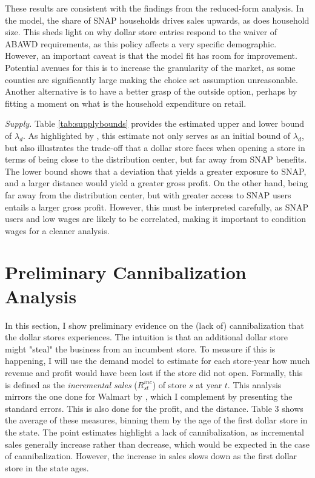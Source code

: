 \documentclass[11.5pt]{article}
\begin{document}
These results are consistent with the findings from the reduced-form analysis. In the model, the share of SNAP households drives sales upwards, as does household size. This sheds light on why dollar store entries respond to the waiver of ABAWD requirements, as this policy affects a very specific demographic. However, an important caveat is that the model fit has room for improvement. Potential avenues for this is to increase the granularity of the market, as some counties are significantly large making the choice set assumption unreasonable. Another alternative is to have a better grasp of the outside option, perhaps by fitting a moment on what is the household expenditure on retail. 






\newpage
\textit{Supply.} Table \ref{tab:supplybounds} provides the estimated upper and lower bound of $\lambda_d$. As highlighted by \citeauthor{houde2023nexus} \citeyear{houde2023nexus}, this estimate not only serves as an initial bound of $\lambda_d$, but also illustrates the trade-off that a dollar store faces when opening a store in terms of being close to the distribution center, but far away from SNAP benefits. The lower bound shows that a deviation that yields a greater exposure to SNAP, and a larger distance would yield a greater gross profit. On the other hand, being far away from the distribution center, but with greater access to SNAP users entails a larger gross profit. However, this must be interpreted carefully, as SNAP users and low wages are likely to be correlated, making it important to condition wages for a cleaner analysis. 





\section{Preliminary Cannibalization Analysis}

In this section, I show preliminary evidence on the (lack of) cannibalization that the dollar stores experiences. The intuition is that an additional dollar store might "steal" the business from an incumbent store. To measure if this is happening, I will use the demand model to estimate for each store-year how much revenue and profit would have been lost if the store did not open. Formally, this is defined as the \textit{incremental sales} ($R^{inc}_{st}$) of store $s$ at year $t$. This analysis mirrors the one done for Walmart by \citeauthor{holmes2011diffusion} \citeyear{holmes2011diffusion}, which I complement by presenting the standard errors. This is also done for the profit, and the distance. Table 3 shows the average of these measures, binning them by the age of the first dollar store in the state. The point estimates highlight a lack of cannibalization, as incremental sales generally increase rather than decrease, which would be expected in the case of cannibalization. However, the increase in sales slows down as the first dollar store in the state ages.
\end{document}
